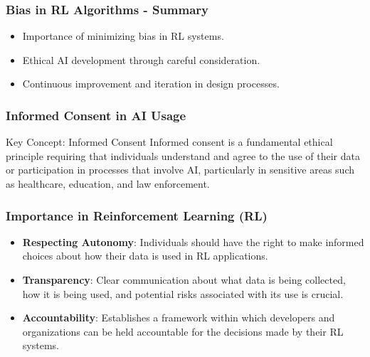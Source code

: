 \documentclass[aspectratio=169]{beamer}
\begin{document}
\begin{frame}[fragile]
  \frametitle{Bias in RL Algorithms - Summary}
  \begin{itemize}
    \item Importance of minimizing bias in RL systems.
    \item Ethical AI development through careful consideration.
    \item Continuous improvement and iteration in design processes.
  \end{itemize}
\end{frame}

\begin{frame}[fragile]
    \frametitle{Informed Consent in AI Usage}
    \begin{block}{Key Concept: Informed Consent}
        Informed consent is a fundamental ethical principle requiring that individuals understand and agree to the use of their data or participation in processes that involve AI, particularly in sensitive areas such as healthcare, education, and law enforcement.
    \end{block}
\end{frame}

\begin{frame}[fragile]
    \frametitle{Importance in Reinforcement Learning (RL)}
    \begin{itemize}
        \item \textbf{Respecting Autonomy}: Individuals should have the right to make informed choices about how their data is used in RL applications.
        \item \textbf{Transparency}: Clear communication about what data is being collected, how it is being used, and potential risks associated with its use is crucial.
        \item \textbf{Accountability}: Establishes a framework within which developers and organizations can be held accountable for the decisions made by their RL systems.
    \end{itemize}
\end{frame}
\end{document}
